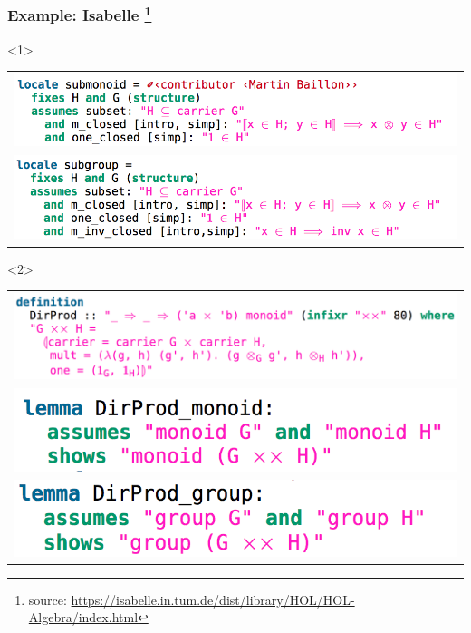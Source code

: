 \documentclass[t,12pt,numbers,fleqn,usenames,xcolor=dvipsnames]{beamer}
\begin{document}
\begin{frame}[fragile]
\frametitle{Example: Isabelle \footnote{\tiny{source: 
			\url{https://isabelle.in.tum.de/dist/library/HOL/HOL-Algebra/index.html}}}}
\begin{onlyenv}<1>
\begin{tabular}{l}	
	\includegraphics[scale=0.3]{isabelle_example/submon_hr.png}\\		
	\includegraphics[scale=0.3]{isabelle_example/subgroup_hr.png}
\end{tabular}	
\end{onlyenv}		
\begin{onlyenv}<2>
\begin{tabular}{l}	
	\includegraphics[scale=0.2]{isabelle_example/prod_hr.png}\\		
	\includegraphics[scale=0.2]{isabelle_example/prod_mon_hr.png}\\
	\includegraphics[scale=0.2]{isabelle_example/prod_group_hr.png}
\end{tabular}	
\end{onlyenv}		

\end{frame}
\end{document}
